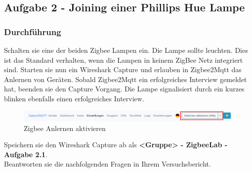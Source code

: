 \subsection{Aufgabe 2 - Joining einer Phillips Hue Lampe}

\subsubsection{Durchführung}
Schalten sie eine der beiden Zigbee Lampen ein. Die Lampe sollte leuchten. Dies ist das Standard verhalten, wenn die Lampen in keinem ZigBee Netz integriert sind.
Starten sie nun ein Wireshark Capture und erlauben in Zigbee2Mqtt das Anlernen von Geräten. Sobald Zigbee2Mqtt ein erfolgreiches Interview gemeldet hat, beenden sie
den Capture Vorgang. Die Lampe signalisiert durch ein kurzes blinken ebenfalls einen erfolgreiches Interview.

\begin{figure}[H]
    \centering
    \includegraphics[width=1\textwidth]{media/Z2M-Anlernen.png}
    \caption{Zigbee Anlernen aktivieren}
\end{figure}

\begin{Aufgabe}
    Speichern sie den Wireshark Capture ab als \textbf{\grqq <Gruppe> - ZigbeeLab - Aufgabe 2.1\grqq{}}. \\
    Beantworten sie die nachfolgenden Fragen in Ihrem Versuchsbericht.
\end{Aufgabe}

